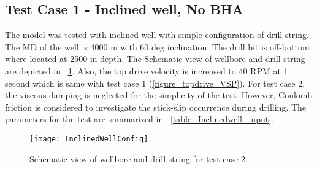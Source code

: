 
\subsection{Test Case 1 - Inclined well, No BHA}

The model was tested with inclined well with simple configuration of drill string. The MD of the well is 4000 m with 60 deg inclination. The drill bit is off-bottom where located at 2500 m depth. The Schematic view of wellbore and drill string are depicted in \figurename~\ref{figure_wellconfig_inclined}. Also, the top drive velocity is increased to 40 RPM at 1 second which is same with test case 1 (\figurename\ref{figure_topdrive_VSP}). For test case 2, the viscous damping is neglected for the simplicity of the test. However, Coulomb friction is considered to investigate the stick-slip occurrence during drilling. The parameters for the test are summarized in \tablename~\ref{table_Inclinedwell_input}.

\begin{figure}[!hbt]
  \centering
  \texttt{[image: InclinedWellConfig]}
  \caption[Schematic view of test case 2.]{Schematic view of wellbore and drill string for test case 2.}\label{figure_wellconfig_inclined}
\end{figure}

